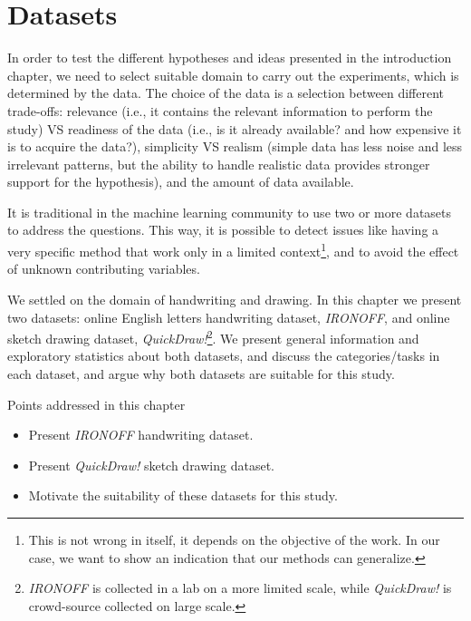 \chapter{Datasets} \label{ch:dataset}
\minitoc%

\par In order to test the different hypotheses and ideas presented in the introduction chapter, we need to select suitable domain to carry out the experiments, which is determined by the data. The choice of the data is a selection between different trade-offs: relevance (i.e., it contains the relevant information to perform the study) VS readiness of the data (i.e., is it already available? and how expensive it is to acquire the data?), simplicity VS realism (simple data has less noise and less irrelevant patterns, but the ability to handle realistic data provides stronger support for the hypothesis), and the amount of data available.

\par It is traditional in the machine learning community to use two or more datasets to address the questions. This way, it is possible to detect issues like having a very specific method that work only in a limited context\footnote{This is not wrong in itself, it depends on the objective of the work. In our case, we want to show an indication that our methods can generalize.}, and to avoid the effect of unknown contributing variables.

\par We settled on the domain of handwriting and drawing. In this chapter we present two datasets: online English letters handwriting dataset, \textit{IRONOFF}, and online sketch drawing dataset, \textit{QuickDraw!}\footnote{\textit{IRONOFF} is collected in a lab on a more limited scale, while \textit{QuickDraw!} is crowd-source collected on large scale.}. We present general information and exploratory statistics about both datasets, and discuss the categories/tasks in each dataset, and argue why both datasets are suitable for this study.

\begin{mdframed}[backgroundcolor=blue!20]
    \begin{center}
        Points addressed in this chapter
    \end{center}

    \begin{itemize}
        \item Present \textit{IRONOFF} handwriting dataset.
        \item Present \textit{QuickDraw!} sketch drawing dataset.
        \item Motivate the suitability of these datasets for this study.
    \end{itemize}
\end{mdframed}

